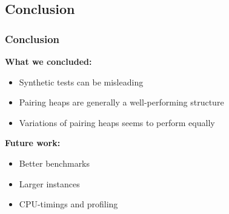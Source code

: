 \documentclass{beamer}
\begin{document}
\begin{frame}


\subsection{Conclusion}
\frametitle{Conclusion}

\textbf{What we concluded:}
\begin{itemize}
\item Synthetic tests can be misleading
\item Pairing heaps are generally a well-performing structure
\item Variations of pairing heaps seems to perform equally
\end{itemize}

\textbf{Future work:}
\begin{itemize}
\item Better benchmarks
\item Larger instances
\item CPU-timings and profiling
\end{itemize}

\end{frame}
\end{document}
